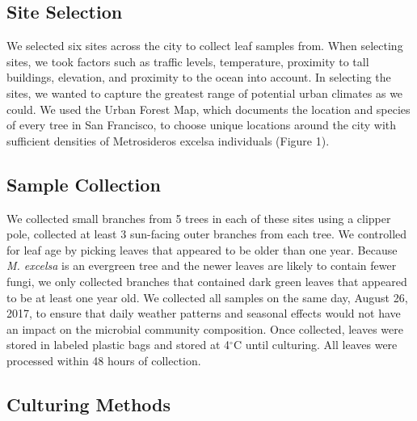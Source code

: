 \documentclass[fleqn,10pt,lineno]{wlpeerj} %
\begin{document}
\hypertarget{site-selection}{%
\subsection*{Site Selection}\label{site-selection}}

We selected six sites across the city to collect leaf samples from. When selecting sites, we took factors such as traffic levels, temperature, proximity to tall buildings, elevation, and proximity to the ocean into account. In selecting the sites, we wanted to capture the greatest range of potential urban climates as we could. We used the Urban Forest Map, which documents the location and species of every tree in San Francisco, to choose unique locations around the city with sufficient densities of Metrosideros excelsa individuals (Figure 1).

\hypertarget{sample-collection}{%
\subsection*{Sample Collection}\label{sample-collection}}

We collected small branches from 5 trees in each of these sites using a clipper pole, collected at least 3 sun-facing outer branches from each tree. We controlled for leaf age by picking leaves that appeared to be older than one year. Because \emph{M. excelsa} is an evergreen tree and the newer leaves are likely to contain fewer fungi, we only collected branches that contained dark green leaves that appeared to be at least one year old. We collected all samples on the same day, August 26, 2017, to ensure that daily weather patterns and seasonal effects would not have an impact on the microbial community composition. Once collected, leaves were stored in labeled plastic bags and stored at 4\(^{\circ}\)C until culturing. All leaves were processed within 48 hours of collection.

\hypertarget{culturing-methods}{%
\subsection*{Culturing Methods}\label{culturing-methods}}
\end{document}

